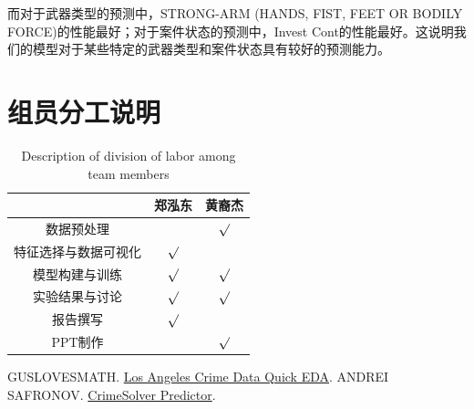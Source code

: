 \documentclass{article}
\begin{document}
而对于武器类型的预测中，STRONG-ARM (HANDS, FIST, FEET OR BODILY FORCE)的性能最好；对于案件状态的预测中，Invest Cont的性能最好。这说明我们的模型对于某些特定的武器类型和案件状态具有较好的预测能力。

\section{组员分工说明}

\begin{table}[H]
    \centering
    \begin{tabular}{|c|c|c|}
        \hline
                   & 郑泓东     & 黄裔杰     \\
        \hline
        数据预处理      &         & $\surd$ \\
        \hline
        特征选择与数据可视化 & $\surd$ &         \\
        \hline
        模型构建与训练    & $\surd$ & $\surd$ \\
        \hline
        实验结果与讨论    & $\surd$ & $\surd$ \\
        \hline
        报告撰写       & $\surd$ &         \\
        \hline
        PPT制作      &         & $\surd$ \\
        \hline
    \end{tabular}
    \caption{Description of division of labor among team members}
    \label{tab:division_of_labor}
\end{table}

\begin{thebibliography}{99}
     GUSLOVESMATH. \href{https://www.kaggle.com/code/guslovesmath/los-angeles-crime-data-quick-eda}{Los Angeles Crime Data Quick EDA}.
     ANDREI SAFRONOV. \href{https://www.kaggle.com/code/safronov00/crimesolver-predictor#2.-Clean-Data}{CrimeSolver Predictor}.
\end{thebibliography}
\end{document}

